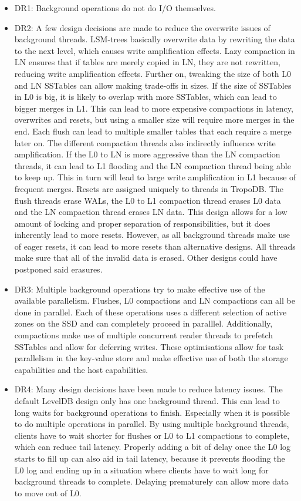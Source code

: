 \begin{itemize}
    \item DR1: Background operations do not do I/O themselves.
    \item DR2: A few design decisions are made to reduce the overwrite issues of background threads. LSM-trees basically overwrite data by rewriting the data to the next level, which causes write amplification effects. Lazy compaction in LN ensures that if tables are merely copied in LN, they are not rewritten, reducing write amplification effects. Further on, tweaking the size of both L0 and LN SSTables can allow making trade-offs in sizes. If the size of SSTables in L0 is big, it is likely to overlap with more SSTables, which can lead to bigger merges in L1. This can lead to more expensive compactions in latency, overwrites and resets, but using a smaller size will require more merges in the end. Each flush can lead to multiple smaller tables that each require a merge later on. The different compaction threads also indirectly influence write amplification. If the L0 to LN is more aggressive than the LN compaction threads, it can lead to L1 flooding and the LN compaction thread being able to keep up. This in turn will lead to large write amplification in L1 because of frequent merges. Resets are assigned uniquely to threads in TropoDB. The flush threads erase WALs, the L0 to L1 compaction thread erases L0 data and the LN compaction thread erases LN data. This design allows for a low amount of locking and proper separation of responsibilities, but it does inherently lead to more resets. However, as all background threads make use of eager resets, it can lead to more resets than alternative designs. All threads make sure that all of the invalid data is erased. Other designs could have postponed said erasures. 
    \item DR3: Multiple background operations try to make effective use of the available parallelism. Flushes, L0 compactions and LN compactions can all be done in parallel. Each of these operations uses a different selection of active zones on the SSD and can completely proceed in paralllel. Additionally, compactions make use of multiple concurrent reader threads to prefetch SSTables and allow for deferring writes. These optimisations allow for task parallelism in the key-value store and make effective use of both the storage capabilities and the host capabilities.
    \item DR4: Many design decisions have been made to reduce latency issues. The default LevelDB design only has one background thread. This can lead to long waits for background operations to finish. Especially when it is possible to do multiple operations in parallel. By using multiple background threads, clients have to wait shorter for flushes or L0 to L1 compactions to complete, which can reduce tail latency. Properly adding a bit of delay once the L0 log starts to fill up can also aid in tail latency, because it prevents flooding the L0 log and ending up in a situation where clients have to wait long for background threads to complete. Delaying prematurely can allow more data to move out of L0. 
\end{itemize}

